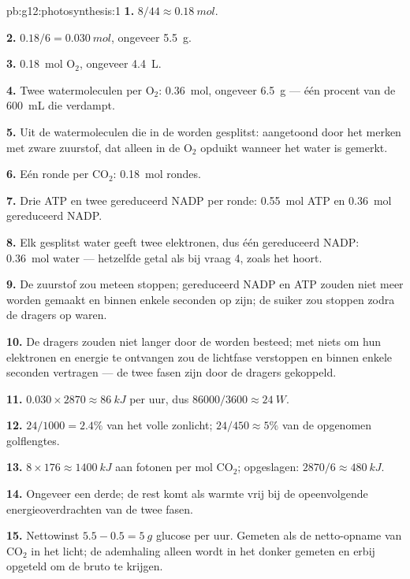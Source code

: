 \begin{solution}{pb:g12:photosynthesis:1}
\textbf{1.} $8/44 \approx \qty{0.18}{mol}$.

\textbf{2.} $0.18/6 = \qty{0.030}{mol}$, ongeveer \qty{5.5}{g}.

\textbf{3.} \qty{0.18}{mol} $\mathrm{O_2}$, ongeveer \qty{4.4}{L}.

\textbf{4.} Twee watermoleculen per $\mathrm{O_2}$: \qty{0.36}{mol},
ongeveer \qty{6.5}{g} --- één procent van de \qty{600}{mL} die verdampt.

\textbf{5.} Uit de watermoleculen die in de  worden gesplitst:
aangetoond door het merken met zware zuurstof, dat alleen in de
$\mathrm{O_2}$ opduikt wanneer het water is gemerkt.

\textbf{6.} Eén ronde per $\mathrm{CO_2}$: \qty{0.18}{mol} rondes.

\textbf{7.} Drie ATP en twee gereduceerd NADP per ronde: \qty{0.55}{mol}
ATP en \qty{0.36}{mol} gereduceerd NADP.

\textbf{8.} Elk gesplitst water geeft twee elektronen, dus één gereduceerd
NADP: \qty{0.36}{mol} water --- hetzelfde getal als bij vraag 4, zoals het
hoort.

\textbf{9.} De zuurstof zou meteen stoppen; gereduceerd NADP en ATP zouden
niet meer worden gemaakt en binnen enkele seconden op zijn; de suiker zou
stoppen zodra de dragers op waren.

\textbf{10.} De dragers zouden niet langer door de  worden
besteed; met niets om hun elektronen en energie te ontvangen zou de
lichtfase verstoppen en binnen enkele seconden vertragen --- de twee fasen
zijn door de dragers gekoppeld.

\textbf{11.} $0.030 \times 2870 \approx \qty{86}{kJ}$ per uur, dus
$86000/3600 \approx \qty{24}{W}$.

\textbf{12.} $24/1000 = 2.4\%$ van het volle zonlicht; $24/450 \approx
5\%$ van de opgenomen golflengtes.

\textbf{13.} $8 \times 176 \approx \qty{1400}{kJ}$ aan fotonen per mol
$\mathrm{CO_2}$; opgeslagen: $2870/6 \approx \qty{480}{kJ}$.

\textbf{14.} Ongeveer een derde; de rest komt als warmte vrij bij de
opeenvolgende energieoverdrachten van de twee fasen.

\textbf{15.} Nettowinst $5.5 - 0.5 = \qty{5}{g}$ glucose per uur. Gemeten
als de netto-opname van $\mathrm{CO_2}$ in het licht; de ademhaling alleen
wordt in het donker gemeten en erbij opgeteld om de bruto  te
krijgen.


\end{solution}

